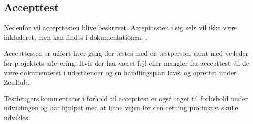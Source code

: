 \subsection{Accepttest}

Nedenfor vil accepttesten blive beskrevet. Accepttesten i sig selv vil ikke være inkluderet, men kan findes i dokumentationen. \cite{Accepttest}. 

Accepttesten er udført hver gang der testes med en testperson, samt med vejleder før projektets aflevering. Hvis der har været fejl eller mangler fra accepttest vil de være dokumenteret i udeståender og en handlingsplan lavet og oprettet under ZenHub.

Testbrugers kommentarer i forhold til accepttest er også taget til forbehold under udviklingen og har hjulpet med at bane vejen for den retning produktet skulle udvikles.
